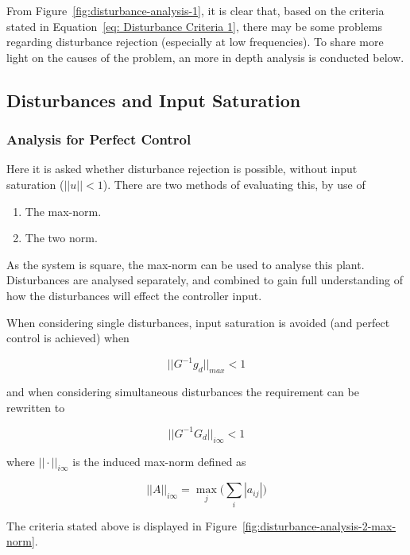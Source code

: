 From Figure~\ref{fig:disturbance-analysis-1}, it is clear that, based on the criteria stated in Equation~\ref{eq: Disturbance Criteria 1}, there may be some problems regarding disturbance rejection (especially at low frequencies). To share more light on the causes of the problem, an more in depth analysis is conducted below.

\subsection{Disturbances and Input Saturation}

\subsubsection{Analysis for Perfect Control}
Here it is asked whether disturbance rejection is possible, without input saturation \newline($||u||<1$). There are two methods of evaluating this, by use of

\begin{enumerate}
	\item The max-norm.
	\item The two norm.
\end{enumerate}

As the system is square, the max-norm can be used to analyse this plant. Disturbances are analysed separately, and combined to gain full understanding of how the disturbances will effect the controller input. 

When considering single disturbances, input saturation is avoided (and perfect control is achieved) when

\begin{equation}
	||G^{-1} g_d||_{max} < 1 
\end{equation} 

and when considering simultaneous disturbances the requirement can be rewritten to

\begin{equation}
	||G^{-1} G_d||_{i\infty} < 1
\end{equation} 

where $||\cdot||_{i\infty}$ is the induced max-norm defined as

\begin{equation}
	||A||_{i\infty} = \max_{j} \Big(\sum_{i}|a_{ij}|\Big)
\end{equation}

The criteria stated above is displayed in Figure~\ref{fig:disturbance-analysis-2-max-norm}.

